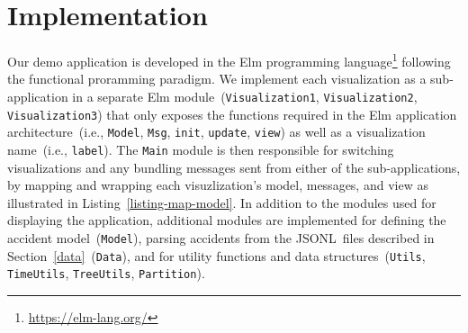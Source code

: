 \section{Implementation}
\label{implementation}
\begin{listing}
    
    \caption{Example of wrapping the \lstinline{update} function from \lstinline{Visualization1} inside the \lstinline{Main} module's \lstinline{update} function. Commands sent from \lstinline{Visualization1} are then mapped to the \lstinline{Main} modules types.}
    \label{listing-map-model}
\end{listing}
Our demo application is developed in the Elm programming language\footnote{\url{https://elm-lang.org/}} following the functional proramming paradigm. We implement each visualization as a sub-application in a separate Elm module~(\lstinline{Visualization1}, \lstinline{Visualization2}, \lstinline{Visualization3}) that only exposes the functions required in the Elm application architecture~(i.e., \lstinline{Model}, \lstinline{Msg}, \lstinline{init}, \lstinline{update}, \lstinline{view}) as well as a visualization name~(i.e., \lstinline{label}). The \lstinline{Main} module is then responsible for switching visualizations and any bundling messages sent from either of the sub-applications, by mapping and wrapping each visuzlization's model, messages, and view as illustrated in Listing~\ref{listing-map-model}. In addition to the modules used for displaying the application, additional modules are implemented for defining the accident model~(\lstinline{Model}), parsing accidents from the JSONL~files described in Section~\ref{data}~(\lstinline{Data}), and for utility functions and data structures~(\lstinline{Utils}, \lstinline{TimeUtils}, \lstinline{TreeUtils}, \lstinline{Partition}).






